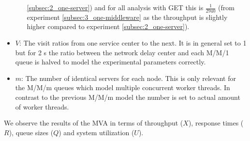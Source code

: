 \begin{itemize}
\begin{itemize}
                                \ref{subsec:2_one-server}) and for all analysis with GET this is $\tfrac{1}{2940}$ (from
                                experiment \ref{subsec:3_one-middleware} as the throughput is slightly higher compared
                                to experiment \ref{subsec:2_one-server}).
                      \end{itemize}
                \item $V$: The visit ratios from one service center to the next. It is in general set to 1 but for 2
                      \mw{}s the ratio between the network delay center and each M/M/1 queue is halved to model the
                      experimental parameters correctly.
                \item $m$: The number of identical servers for each node. This is only relevant for the M/M/m queues which
                      model multiple concurrent worker threads. In contrast to the previous M/M/m model the number is
                      set to actual amount of worker threads.
            \end{itemize}

            We observe the results of the MVA in terms of throughput ($X$), response times ($R$), queue sizes ($Q$) and
            system utilization ($U$).

